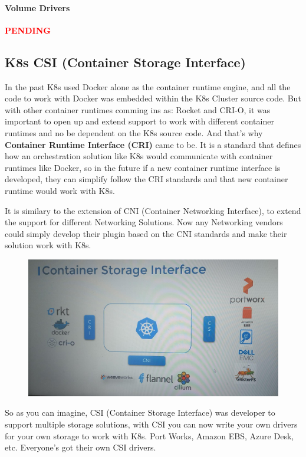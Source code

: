 \documentclass{article}
\begin{document}
\paragraph{Volume Drivers}

\textcolor{red}{\textbf{PENDING}}

\subsection{K8s CSI (Container Storage Interface)}

In the past K8s used Docker alone as the container runtime engine, and all the code to work with Docker was embedded within the K8s Cluster source code. But with other container runtimes comming ins as: Rocket and CRI-O, it was important to open up and extend support to work with different container runtimes and no be dependent on the K8s source code. And that's why \textbf{Container Runtime Interface (CRI)} came to be. It is a standard that defines how an orchestration solution like K8s would communicate with container runtimes like Docker, so in the future if a new container runtime interface is developed, they can simplify follow the CRI standards and that new container runtime would work with K8s.

It is similary to the extension of CNI (Container Networking Interface), to extend the support for different Networking Solutions. Now any Networking vendors could simply develop their plugin based on the CNI standards and make their solution work with K8s.

\begin{figure}[H]
    \includegraphics[width=\textwidth]{pictures/st3.png}
\end{figure}

So as you can imagine, CSI (Container Storage Interface) was developer to support multiple storage solutions, with CSI you can now write your own drivers for your own storage to work with K8s. Port Works, Amazon EBS, Azure Desk, etc. Everyone's got their own CSI drivers.
\end{document}

